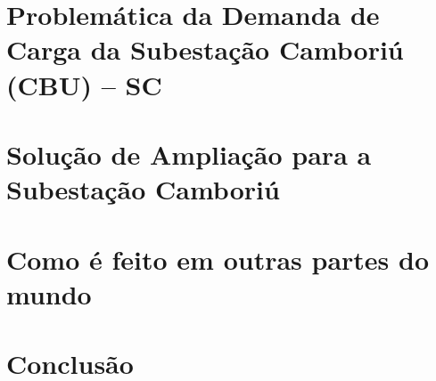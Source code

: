 \documentclass[a5paper,english,spanish,brazil]{ufsc-thesis}
\begin{document}
\chapter{Problemática da Demanda de Carga da Subestação Camboriú (CBU) -- SC}
\label{chap:demCarga}
\lipsum


\chapter{Solução de Ampliação para a Subestação Camboriú}
\label{chap:solAmp}
\lipsum


\chapter{Como é feito em outras partes do mundo}
\label{chap:asbuiltAbroad}
\lipsum


\chapter*[Conclusão]{Conclusão}
\lipsum



\end{document}

